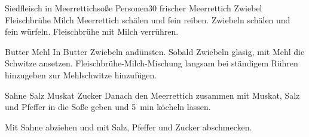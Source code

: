 \begin{MyRecipe}{Siedfleisch in Meerrettichsoße}{ Personen}{\SI{30}{\minuteprime}}
	\ingredient[\Calc{10}{\x}]{\si{\gram}} {frischer Meerrettich}
	\ingredient[\Calc{1}{\x}]{} {Zwiebel}
	\ingredient[\Calc{0.3}{\x}]{\si{\liter}} {Fleischbrühe}
	\ingredient[\Calc{0.2}{\x}]{\si{\liter}} {Milch}
	Meerrettich schälen und fein reiben. Zwiebeln schälen und fein würfeln. Fleischbrühe mit Milch verrühren.\par\bigskip
	
	\ingredient[\Calc{30}{\x}]{\si{\gram}} {Butter}
	 {Mehl}
	In Butter Zwiebeln andünsten. Sobald Zwiebeln glasig, mit Mehl die Schwitze ansetzen. Fleischbrühe-Milch-Mischung langsam bei ständigem Rühren hinzugeben zur Mehlschwitze hinzufügen. \par\bigskip
	
	 {Sahne}
	\ingredient[]{} {Salz}
	\ingredient[]{} {Muskat}
	\ingredient[]{} {Zucker}
	Danach den Meerrettich zusammen mit Muskat, Salz und Pfeffer in die Soße geben und \SI{5}{\minute} köcheln lassen.\par\bigskip
	
	Mit Sahne abziehen und mit Salz, Pfeffer und Zucker abschmecken.\par\bigskip
	
	
	
	
	
\end{MyRecipe}